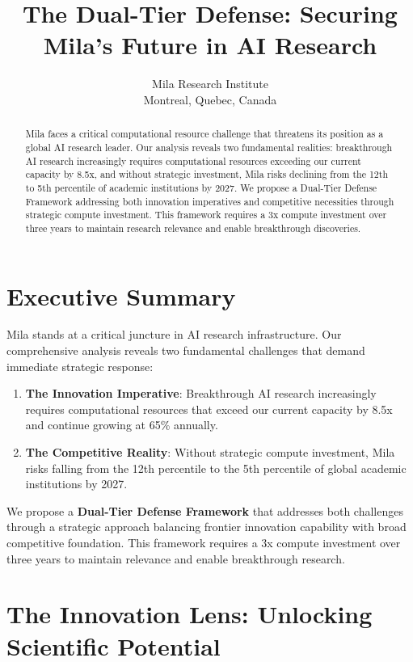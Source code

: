 \documentclass{article}
\title{The Dual-Tier Defense: Securing Mila's Future in AI Research}
\author{%
  Mila Research Institute\\
  Montreal, Quebec, Canada\\
}
\begin{document}
\maketitle

\begin{abstract}
Mila faces a critical computational resource challenge that threatens its position as a global AI research leader. Our analysis reveals two fundamental realities: breakthrough AI research increasingly requires computational resources exceeding our current capacity by 8.5x, and without strategic investment, Mila risks declining from the 12th to 5th percentile of academic institutions by 2027. We propose a Dual-Tier Defense Framework addressing both innovation imperatives and competitive necessities through strategic compute investment. This framework requires a 3x compute investment over three years to maintain research relevance and enable breakthrough discoveries.
\end{abstract}

\section{Executive Summary}

Mila stands at a critical juncture in AI research infrastructure. Our comprehensive analysis reveals two fundamental challenges that demand immediate strategic response:

\begin{enumerate}
\item \textbf{The Innovation Imperative}: Breakthrough AI research increasingly requires computational resources that exceed our current capacity by 8.5x and continue growing at 65\% annually.
\item \textbf{The Competitive Reality}: Without strategic compute investment, Mila risks falling from the 12th percentile to the 5th percentile of global academic institutions by 2027.
\end{enumerate}

We propose a \textbf{Dual-Tier Defense Framework} that addresses both challenges through a strategic approach balancing frontier innovation capability with broad competitive foundation. This framework requires a 3x compute investment over three years to maintain relevance and enable breakthrough research.

\section{The Innovation Lens: Unlocking Scientific Potential}
\end{document}
